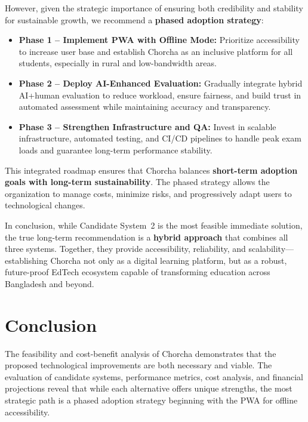 \documentclass[12pt,a4paper,oneside]{book}
\begin{document}
\begin{tcolorbox}[benefitbox, title=Strategic Phased Implementation Plan]
However, given the strategic importance of ensuring both credibility and stability for sustainable growth, we recommend a \textbf{phased adoption strategy}:
\begin{itemize}
    \item \textbf{Phase 1 -- Implement PWA with Offline Mode:} Prioritize accessibility to increase user base and establish Chorcha as an inclusive platform for all students, especially in rural and low-bandwidth areas.
    \item \textbf{Phase 2 -- Deploy AI-Enhanced Evaluation:} Gradually integrate hybrid AI+human evaluation to reduce workload, ensure fairness, and build trust in automated assessment while maintaining accuracy and transparency.
    \item \textbf{Phase 3 -- Strengthen Infrastructure and QA:} Invest in scalable infrastructure, automated testing, and CI/CD pipelines to handle peak exam loads and guarantee long-term performance stability.
\end{itemize}

This integrated roadmap ensures that Chorcha balances \textbf{short-term adoption goals with long-term sustainability}. The phased strategy allows the organization to manage costs, minimize risks, and progressively adapt users to technological changes.
\end{tcolorbox}

\begin{tcolorbox}[impactbox, title=Long-term Vision Statement]
In conclusion, while Candidate System~2 is the most feasible immediate solution, the true long-term recommendation is a \textbf{hybrid approach} that combines all three systems. Together, they provide accessibility, reliability, and scalability---establishing Chorcha not only as a digital learning platform, but as a robust, future-proof EdTech ecosystem capable of transforming education across Bangladesh and beyond.
\end{tcolorbox}

\section{Conclusion}

The feasibility and cost-benefit analysis of Chorcha demonstrates that the proposed technological improvements are both necessary and viable. The evaluation of candidate systems, performance metrics, cost analysis, and financial projections reveal that while each alternative offers unique strengths, the most strategic path is a phased adoption strategy beginning with the PWA for offline accessibility.
\end{document}
